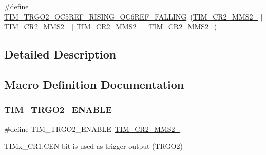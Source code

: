 \begin{DoxyCompactItemize}
\item 
\#define \mbox{\hyperlink{group___t_i_m___master___mode___selection__2_ga90aeea268dbf4be05e4d5f221f40da7c}{T\+I\+M\+\_\+\+T\+R\+G\+O2\+\_\+\+O\+C5\+R\+E\+F\+\_\+\+R\+I\+S\+I\+N\+G\+\_\+\+O\+C6\+R\+E\+F\+\_\+\+F\+A\+L\+L\+I\+NG}}~(\mbox{\hyperlink{group___peripheral___registers___bits___definition_ga3503937610adbf78153c1fcfa4bcd6ea}{T\+I\+M\+\_\+\+C\+R2\+\_\+\+M\+M\+S2\+\_}} $\vert$ \mbox{\hyperlink{group___peripheral___registers___bits___definition_gaa49670c71a446e5201994716b08b1527}{T\+I\+M\+\_\+\+C\+R2\+\_\+\+M\+M\+S2\+\_}} $\vert$ \mbox{\hyperlink{group___peripheral___registers___bits___definition_ga0248e35956d0d22ac66dcd67aab317c5}{T\+I\+M\+\_\+\+C\+R2\+\_\+\+M\+M\+S2\+\_}} $\vert$ \mbox{\hyperlink{group___peripheral___registers___bits___definition_ga07efe60d8d7305b78085233ddaecb990}{T\+I\+M\+\_\+\+C\+R2\+\_\+\+M\+M\+S2\+\_}})
\end{DoxyCompactItemize}


\subsection{Detailed Description}


\subsection{Macro Definition Documentation}
\mbox{\label{group___t_i_m___master___mode___selection__2_gab9344703b3c1a7936f6b500a6bc26cb9}} 
\subsubsection{\texorpdfstring{TIM\_TRGO2\_ENABLE}{TIM\_TRGO2\_ENABLE}}
{\footnotesize\ttfamily \#define T\+I\+M\+\_\+\+T\+R\+G\+O2\+\_\+\+E\+N\+A\+B\+LE~\mbox{\hyperlink{group___peripheral___registers___bits___definition_ga07efe60d8d7305b78085233ddaecb990}{T\+I\+M\+\_\+\+C\+R2\+\_\+\+M\+M\+S2\+\_}}}

T\+I\+Mx\+\_\+\+C\+R1.\+C\+EN bit is used as trigger output (T\+R\+G\+O2) \mbox{\label{group___t_i_m___master___mode___selection__2_ga6199721bcb0eb5f89dcd0b1055f7376f}} 
